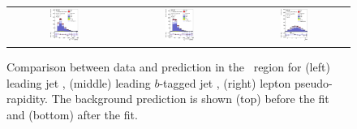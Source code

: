 \begin{figure}[tp]
\begin{tabular}{ccc}
  \includegraphics[width=0.27\textwidth]{Analysis/Figures_ttH/tesis_vars/postfit/jet1_pt_6jetin4btagin.eps} &
  \includegraphics[width=0.27\textwidth]{Analysis/Figures_ttH/tesis_vars/postfit/bjet1_pt_6jetin4btagin.eps} &
  \includegraphics[width=0.27\textwidth]{Analysis/Figures_ttH/tesis_vars/postfit/lep_eta_6jetin4btagin.eps} \\
\end{tabular}
\caption{Comparison between data and prediction in the \sixfour\ region for (left) leading jet \pt, (middle) leading $b$-tagged jet \pt, (right) lepton pseudo-rapidity. The background prediction is shown (top) before the fit and (bottom) after the fit.}
  \label{fig:vars2_sixfour}
\end{figure}
